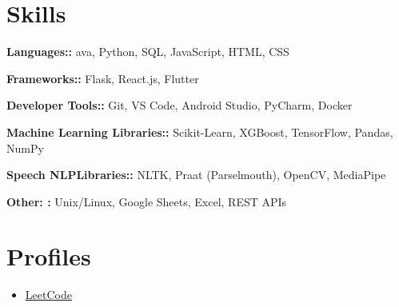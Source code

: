 \documentclass[letterpaper,11pt]{article}
\newcommand{\resumeItem}[1]{
  \item\small{
    {#1 \vspace{-2pt}}
  }
}
\newcommand{\resumeSubHeadingListStart}{\begin{itemize}[leftmargin=0.15in, label={}]}
\newcommand{\resumeSubHeadingListEnd}{\end{itemize}}
\newcommand{\resumeItemListStart}{\begin{itemize}}
\newcommand{\resumeItemListEnd}{\end{itemize}\vspace{-5pt}}
\begin{document}

\section{Skills}
  \vspace{2pt}
  \resumeSubHeadingListStart
    \small{\item{

  
    \textbf{ Languages::}{ ava, Python, SQL, JavaScript, HTML, CSS} \ \vspace{3pt}

    \textbf{ Frameworks::}{  Flask, React.js, Flutter} \ \vspace{3pt}

    \textbf{ Developer Tools::}{  Git, VS Code, Android Studio, PyCharm, Docker} \ \vspace{3pt}

    \textbf{ Machine Learning Libraries::}{ Scikit-Learn, XGBoost, TensorFlow, Pandas, NumPy} \ \vspace{3pt}

    \textbf{ Speech NLPLibraries::}{ NLTK, Praat (Parselmouth), OpenCV, MediaPipe} \ \vspace{3pt}

    \textbf{ Other: :}{ Unix/Linux, Google Sheets, Excel, REST APIs} \ \vspace{3pt}

}}
\resumeSubHeadingListEnd




\section{Profiles}
  \vspace{2pt}
  \resumeItemListStart
  \resumeItem{\underline{\href{https://leetcode.com/harman_13/}{LeetCode}}}
  \resumeItemListEnd

\end{document}
